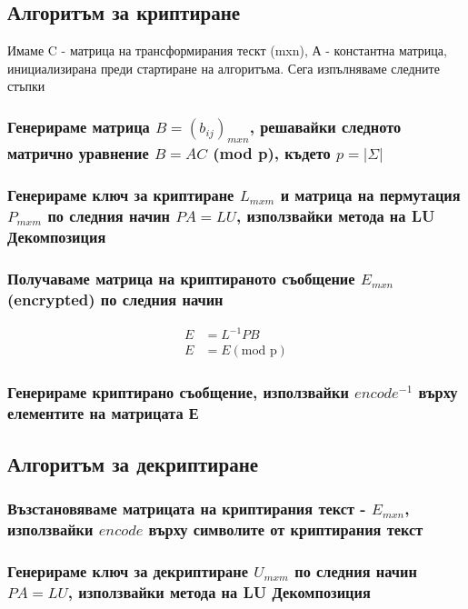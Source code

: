 \documentclass{article}
\begin{document}
\subsection{Алгоритъм за криптиране}
Имаме C - матрица на трансформирания тескт (mxn), А - константна матрица, инициализирана преди стартиране на алгоритъма. Сега изпълняваме следните стъпки
\subsubsection{ Генерираме матрица $B = (b_{ij})_{mxn}$, решавайки следното матрично уравнение $B = AC$ (mod p), където $p = |\Sigma|$}
\subsubsection{ Генерираме ключ за криптиране $L_{mxm}$ и матрица на пермутация $P_{mxm}$ по следния начин $PA = LU$, използвайки метода на LU Декомпозиция}
\subsubsection{ Получаваме матрица на криптираното съобщение $E_{mxn}$ (encrypted) по следния начин}
\begin{equation*}
\begin{split}
 E & = L^{-1}PB\\ E & = E (\text{mod p})
\end{split}
\end{equation*}
\subsubsection{ Генерираме криптирано съобщение, използвайки $encode^{-1}$ върху елементите на матрицата Е}

\subsection{Алгоритъм за декриптиране}
\subsubsection{ Възстановяваме матрицата на криптирания текст - $E_{mxn}$, използвайки $encode$ върху символите от криптирания текст}
\subsubsection{ Генерираме ключ за декриптиране $U_{mxm}$ по следния начин $PA = LU$, използвайки метода на LU Декомпозиция}
\end{document}

